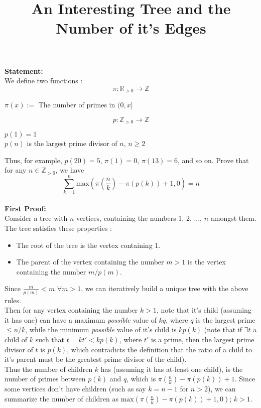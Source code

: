 \documentclass{article}
\title{\textbf{An Interesting Tree and the Number of it's Edges}}
\begin{document}
\maketitle
\noindent
{\bf Statement:}\\ 
We define two functions :
$$ \pi : \mathbb{R}_{>0}\longrightarrow\mathbb{Z} $$
\begin{center}
    $ \pi(x) := $ The number of primes in $ (0, x] $
\end{center}
$$ p : \mathbb{Z}_{>0}\longrightarrow\mathbb{Z} $$
\begin{center}
    $p(1) = 1$\\
    $p(n)$ is the largest prime divisor of  $n$, $n \geq 2$
\end{center}
Thus, for example, $p(20) = 5$, $\pi(1) = 0$, $\pi(13) = 6$, and so on.
Prove that for any $n \in \mathbb{Z}_{>0}$, we have\\
$$\sum_{k=1}^{n} \mathrm{max}(\pi(\frac{n}{k}) - \pi(p(k)) + 1, 0) = n$$
\\
\noindent
{\bf First Proof:}\\ 
Consider a tree with $n$ vertices, containing the numbers 1, 2, ..., $n$ amongst them. The tree satisfies these properties :
\begin{itemize}
    \item The root of the tree is the vertex containing 1.
    \item The parent of the vertex containing the number $m > 1$ is the vertex containing the number $m/p(m)$.
\end{itemize}
Since $\frac{m}{p(m)} < m$ $\forall m > 1$, we can iteratively build a unique tree with the above rules.\\
Then for any vertex containing the number $k > 1$, note that it's child (assuming it has one) can have a maximum \emph{possible} value of $kq$, where $q$ is the largest prime $\leq n/k$, while the minimum \emph{possible} value of it's child is $kp(k)$ (note that if $\exists t$ a child of $k$ such that $t = kt' < kp(k)$, where $t'$ is a prime, then the largest prime divisor of $t$ is $p(k)$, which contradicts the definition that the ratio of a child to it's parent must be the greatest prime divisor of the child).\\
Thus the number of children $k$ has (assuming it has at-least one child), is the number of primes between $p(k)$ and $q$, which is $\pi(\frac{n}{k}) - \pi(p(k)) + 1$. Since some vertices don't have children (such as say $k = n -1$ for $n > 2$), we can summarize the number of children as $\mathrm{max}(\pi(\frac{n}{k}) - \pi(p(k)) + 1, 0)$; $k > 1$.\\
\end{document}
